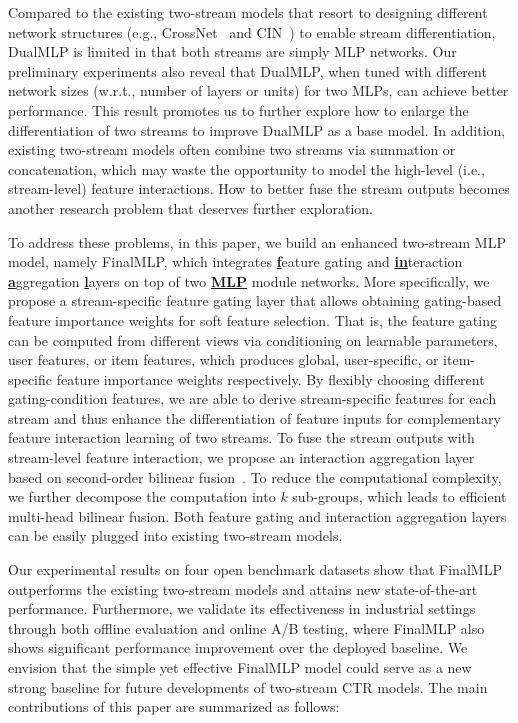 \documentclass[letterpaper]{article} \usepackage{aaai23}  \usepackage{times}  \usepackage{helvet}  \usepackage{courier}  \usepackage[hyphens]{url}  \usepackage{graphicx} \urlstyle{rm} \def\UrlFont{\rm}  \usepackage{natbib}  \usepackage{caption} \frenchspacing  \setlength{\pdfpagewidth}{8.5in}  \setlength{\pdfpageheight}{11in}  \usepackage{algorithm}
\begin{document}
Compared to the existing two-stream models that resort to designing different network structures (e.g., CrossNet~\cite{DCN} and CIN~\cite{xDeepFM}) to enable stream differentiation, DualMLP is limited in that both streams are simply MLP networks. Our preliminary experiments also reveal that DualMLP, when tuned with different network sizes (w.r.t., number of layers or units) for two MLPs, can achieve better performance. This result promotes us to further explore how to enlarge the differentiation of two streams to improve DualMLP as a base model. In addition, existing two-stream models often combine two streams via summation or concatenation, which may waste the opportunity to model the high-level (i.e., stream-level) feature interactions. How to better fuse the stream outputs becomes another research problem that deserves further exploration.







To address these problems, in this paper, we build an enhanced two-stream MLP model, namely FinalMLP, which integrates \underline{\textbf{f}}eature gating and \underline{\textbf{in}}teraction \underline{\textbf{a}}ggregation \underline{\textbf{l}}ayers on top of two \underline{\textbf{MLP}} module networks. More specifically, we propose a stream-specific feature gating layer that allows obtaining gating-based feature importance weights for soft feature selection. That is, the feature gating can be computed from different views via conditioning on learnable parameters, user features, or item features, which produces global, user-specific, or item-specific feature importance weights respectively. By flexibly choosing different gating-condition features, we are able to derive stream-specific features for each stream and thus enhance the differentiation of feature inputs for complementary feature interaction learning of two streams. To fuse the stream outputs with stream-level feature interaction, we propose an interaction aggregation layer based on second-order bilinear fusion~\cite{BilinearCNN,BilinearModel}. To reduce the computational complexity, we further decompose the computation into $k$ sub-groups, which leads to efficient multi-head bilinear fusion. Both feature gating and interaction aggregation layers can be easily plugged into existing two-stream models.

Our experimental results on four open benchmark datasets show that FinalMLP outperforms the existing two-stream models and attains new state-of-the-art performance. Furthermore, we validate its effectiveness in industrial settings through both offline evaluation and online A/B testing, where FinalMLP also shows significant performance improvement over the deployed baseline. We envision that the simple yet effective FinalMLP model could serve as a new strong baseline for future developments of two-stream CTR models. The main contributions of this paper are summarized as follows:
\end{document}

